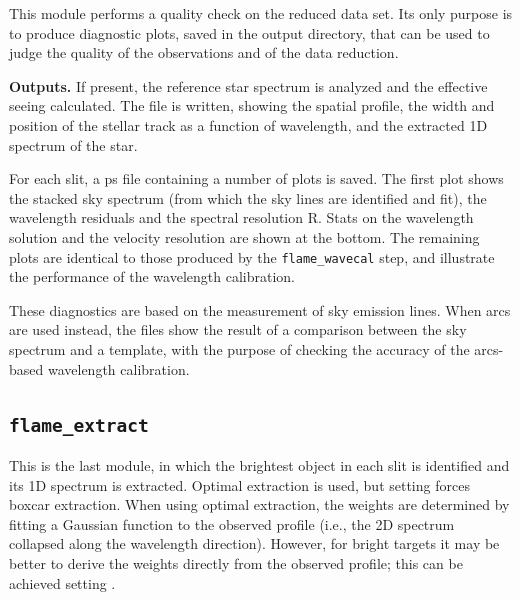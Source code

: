 \documentclass[a4paper]{article}
\begin{document}
\begin{sloppypar}
This module performs a quality check on the reduced data set. Its only purpose is to produce diagnostic plots, saved in the output directory, that can be used to judge the quality of the observations and of the data reduction.

\medskip
\noindent
\textbf{Outputs.} If present, the reference star spectrum is analyzed and the effective seeing calculated. The file  is written, showing the spatial profile, the width and position of the stellar track as a function of wavelength, and the extracted 1D spectrum of the star.

For each slit, a ps file containing a number of plots is saved. The first plot shows the stacked sky spectrum (from which the sky lines are identified and fit), the wavelength residuals and the spectral resolution R. Stats on the wavelength solution and the velocity resolution are shown at the bottom. The remaining plots are identical to those produced by the \texttt{flame\_wavecal} step, and illustrate the performance of the wavelength calibration.

These diagnostics are based on the measurement of sky emission lines. When arcs are used instead, the files show the result of a comparison between the sky spectrum and a template, with the purpose of checking the accuracy of the arcs-based wavelength calibration.



\subsection{\texttt{flame\_extract}}
\label{sec:extract}

This is the last module, in which the brightest object in each slit is identified and its 1D spectrum is extracted. Optimal extraction is used, but setting  forces boxcar extraction. When using optimal extraction, the weights are determined by fitting a Gaussian function to the observed profile (i.e., the 2D spectrum collapsed along the wavelength direction). However, for bright targets it may be better to derive the weights directly from the observed profile; this can be achieved setting .


\end{sloppypar}
\end{document}
